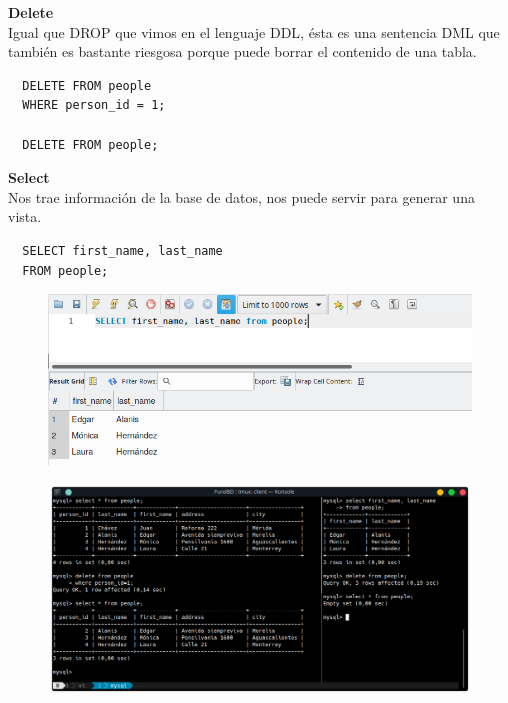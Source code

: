 \documentclass{article}
\begin{document}
\vspace{0.4cm}

\textbf{Delete}\\
Igual que DROP que vimos en el lenguaje DDL, ésta es una sentencia DML que
también es bastante riesgosa porque puede borrar el contenido de una tabla.

\begin{verbatim}
  DELETE FROM people
  WHERE person_id = 1;

  DELETE FROM people;
\end{verbatim}

\vspace{0.4cm}

\textbf{Select}\\
Nos trae información de la base de datos, nos puede servir para generar una
vista.
\begin{verbatim}
  SELECT first_name, last_name
  FROM people;
\end{verbatim}

\begin{figure}[h!]
  \centering
  \includegraphics[scale=0.65]{./Pictures/064_select.png}
\end{figure}

\newpage

\begin{figure}[h!]
  \centering
  \includegraphics[scale=0.65]{./Pictures/152_dml_select_delete.png}
\end{figure}
\end{document}
